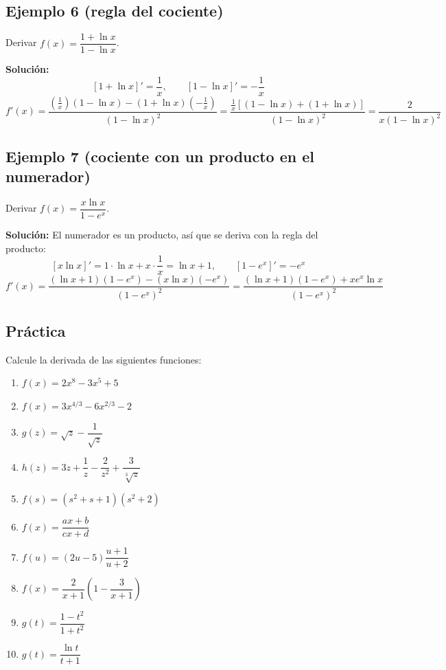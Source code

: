 \documentclass[12pt]{article}
\begin{document}
\subsection{Ejemplo 6 (regla del cociente)}
Derivar $f(x) = \dfrac{1 + \ln x}{1 - \ln x}$.

\textbf{Solución:}
\[
[1 + \ln x]' = \frac{1}{x}, \qquad [1 - \ln x]' = -\frac{1}{x}
\]
\[
f'(x) = \frac{\left(\frac{1}{x}\right)(1 - \ln x) - (1 + \ln x)\left(-\frac{1}{x}\right)}{(1 - \ln x)^2}
= \frac{\frac{1}{x}\left[(1 - \ln x) + (1 + \ln x)\right]}{(1 - \ln x)^2}
= \frac{2}{x(1 - \ln x)^2}
\]

\subsection{Ejemplo 7 (cociente con un producto en el numerador)}
Derivar $f(x) = \dfrac{x \ln x}{1 - e^x}$.

\textbf{Solución:} El numerador es un producto, así que se deriva con la regla del producto:
\[
[x \ln x]' = 1 \cdot \ln x + x \cdot \frac{1}{x} = \ln x + 1, \qquad [1 - e^x]' = -e^x
\]
\[
f'(x) = \frac{(\ln x + 1)(1 - e^x) - (x \ln x)(-e^x)}{(1 - e^x)^2} = \frac{(\ln x + 1)(1 - e^x) + x e^x \ln x}{(1 - e^x)^2}
\]

\subsection{Práctica}
Calcule la derivada de las siguientes funciones:
\begin{enumerate}
    \item $f(x) = 2x^8 - 3x^5 + 5$
    \item $f(x) = 3x^{4/3} - 6x^{2/3} - 2$
    \item $g(z) = \sqrt{z} - \dfrac{1}{\sqrt{z}}$
    \item $h(z) = 3z + \dfrac{1}{z} - \dfrac{2}{z^2} + \dfrac{3}{\sqrt[3]{z}}$
    \item $f(s) = (s^2 + s + 1)(s^2 + 2)$
    \item $f(x) = \dfrac{ax + b}{cx + d}$
    \item $f(u) = (2u - 5)\dfrac{u + 1}{u + 2}$
    \item $f(x) = \dfrac{2}{x + 1}\left(1 - \dfrac{3}{x + 1}\right)$
    \item $g(t) = \dfrac{1 - t^2}{1 + t^2}$
    \item $g(t) = \dfrac{\ln t}{t + 1}$
\end{enumerate}
\end{document}
